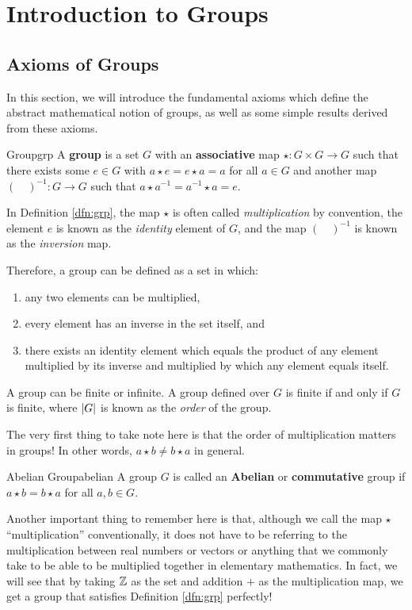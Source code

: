 \documentclass[math, code]{amznotes}
\theoremstyle{remark}
\begin{document}
\tableofcontents

\chapter{Introduction to Groups}
\section{Axioms of Groups}
In this section, we will introduce the fundamental axioms which define the abstract mathematical notion of groups, as well as some simple results derived from these axioms.
\begin{dfnbox}{Group}{grp}
    A {\color{red} \textbf{group}} is a set $G$ with an {\color{red} \textbf{associative}} map $\star \colon G \times G \to G$ such that there exists some $e \in G$ with $a \star e = e \star a = a$ for all $a \in G$ and another map $(\quad)^{-1} \colon G \to G$ such that $a \star a^{-1} = a^{-1} \star a = e$.
\end{dfnbox}
In Definition \ref{dfn:grp}, the map $\star$ is often called \textit{multiplication} by convention, the element $e$ is known as the \textit{identity} element of $G$, and the map $(\quad)^{-1}$ is known as the \textit{inversion} map.

Therefore, a group can be defined as a set in which:
\begin{enumerate}
    \item any two elements can be multiplied,
    \item every element has an inverse in the set itself, and
    \item there exists an identity element which equals the product of any element multiplied by its inverse and multiplied by which any element equals itself.
\end{enumerate}
A group can be finite or infinite. A group defined over $G$ is finite if and only if $G$ is finite, where ${\left\lvert {G} \right\rvert}$ is known as the \textit{order} of the group. 

The very first thing to take note here is that the order of multiplication matters in groups! In other words, $a \star b \neq b \star a$ in general.
\begin{dfnbox}{Abelian Group}{abelian}
    A group $G$ is called an {\color{red} \textbf{Abelian}} or {\color{red} \textbf{commutative}} group if $a \star b = b \star a$ for all $a, b \in G$.
\end{dfnbox}
Another important thing to remember here is that, although we call the map $\star$ ``multiplication'' conventionally, it does not have to be referring to the multiplication between real numbers or vectors or anything that we commonly take to be able to be multiplied together in elementary mathematics. In fact, we will see that by taking $\mathbb{Z}$ as the set and addition $+$ as the multiplication map, we get a group that satisfies Definition \ref{dfn:grp} perfectly!
\end{document}
